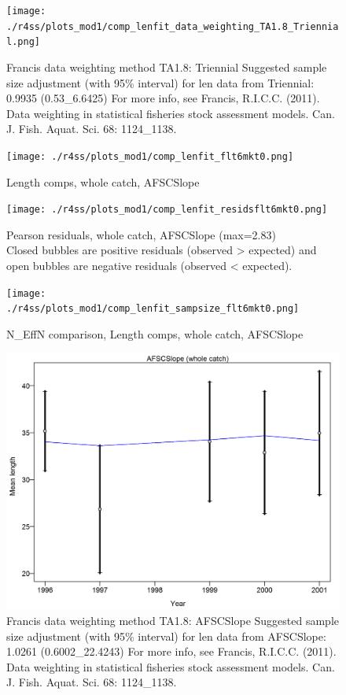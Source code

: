 \documentclass[12pt,]{article}
\begin{document}
\begin{figure}
\centering
\texttt{[image: ./r4ss/plots\_mod1/comp\_lenfit\_data\_weighting\_TA1.8\_Triennial.png]}
\caption{Francis data weighting method TA1.8: Triennial Suggested sample
size adjustment (with 95\% interval) for len data from Triennial: 0.9935
(0.53\_6.6425) For more info, see Francis, R.I.C.C. (2011). Data
weighting in statistical fisheries stock assessment models. Can. J.
Fish. Aquat. Sci. 68: 1124\_1138.
\label{fig:mod1_21_comp_lenfit_data_weighting_TA1.8_Triennial}}
\end{figure}

\begin{figure}
\centering
\texttt{[image: ./r4ss/plots\_mod1/comp\_lenfit\_flt6mkt0.png]}
\caption{Length comps, whole catch, AFSCSlope
\label{fig:mod1_22_comp_lenfit_flt6mkt0}}
\end{figure}

\begin{figure}
\centering
\texttt{[image: ./r4ss/plots\_mod1/comp\_lenfit\_residsflt6mkt0.png]}
\caption{Pearson residuals, whole catch, AFSCSlope (max=2.83)\\
Closed bubbles are positive residuals (observed \textgreater{} expected)
and open bubbles are negative residuals (observed \textless{} expected).
\label{fig:mod1_23_comp_lenfit_residsflt6mkt0}}
\end{figure}

\begin{figure}
\centering
\texttt{[image: ./r4ss/plots\_mod1/comp\_lenfit\_sampsize\_flt6mkt0.png]}
\caption{N\_EffN comparison, Length comps, whole catch, AFSCSlope
\label{fig:mod1_24_comp_lenfit_sampsize_flt6mkt0}}
\end{figure}

\begin{figure}
\centering
\includegraphics{./r4ss/plots_mod1/comp_lenfit_data_weighting_TA1.8_AFSCSlope.png}
\caption{Francis data weighting method TA1.8: AFSCSlope Suggested sample
size adjustment (with 95\% interval) for len data from AFSCSlope: 1.0261
(0.6002\_22.4243) For more info, see Francis, R.I.C.C. (2011). Data
weighting in statistical fisheries stock assessment models. Can. J.
Fish. Aquat. Sci. 68: 1124\_1138.
\label{fig:mod1_25_comp_lenfit_data_weighting_TA1.8_AFSCSlope}}
\end{figure}
\end{document}
